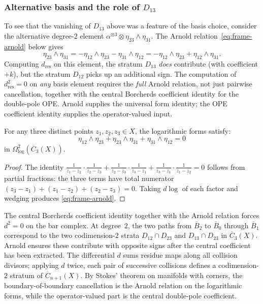 \subsubsection*{Alternative basis and the role of $D_{13}$}

To see that the vanishing of $D_{13}$ above was a feature
of the basis choice, consider the alternative degree-$2$ element
$\alpha^{\otimes 3} \otimes \eta_{23} \wedge \eta_{31}$.
The Arnold relation~\eqref{eq:frame-arnold} below gives
\[
\eta_{23} \wedge \eta_{31}
= -\eta_{12} \wedge \eta_{23} - \eta_{31} \wedge \eta_{12}
= -\eta_{12} \wedge \eta_{23} + \eta_{12} \wedge \eta_{31}.
\]
Computing $d_{\mathrm{res}}$ on this element, the stratum $D_{13}$
\emph{does} contribute (with coefficient $+k$), but the stratum
$D_{12}$ picks up an additional sign. The computation of
$d_{\mathrm{res}}^2 = 0$ on \emph{any} basis element
requires the \emph{full} Arnold relation, not just pairwise
cancellation, together with the central Borcherds coefficient identity
for the double-pole OPE. Arnold supplies the universal form identity;
the OPE coefficient identity supplies the operator-valued input.

\begin{proposition}\label{prop:frame-arnold}
For any three distinct points $z_1, z_2, z_3 \in X$, the
logarithmic forms satisfy:
\begin{equation}\label{eq:frame-arnold}
\eta_{12} \wedge \eta_{23} + \eta_{23} \wedge \eta_{31}
+ \eta_{31} \wedge \eta_{12} = 0
\end{equation}
in $\Omega^2_{\log}(\overline{C}_3(X))$.
\end{proposition}

\begin{proof}
The identity $\frac{1}{z_1-z_2}\cdot\frac{1}{z_2-z_3}
+ \frac{1}{z_2-z_3}\cdot\frac{1}{z_3-z_1}
+ \frac{1}{z_3-z_1}\cdot\frac{1}{z_1-z_2} = 0$
follows from partial fractions: the three terms have
total numerator $(z_3-z_1)+(z_1-z_2)+(z_2-z_3) = 0$.
Taking $d\log$ of each factor and wedging produces
\eqref{eq:frame-arnold}.
\end{proof}

The central Borcherds coefficient identity together with the Arnold
relation forces $d^2 = 0$ on the bar complex. At degree~$2$,
the two paths from $\bar{B}_2$ to $\bar{B}_0$ through $\bar{B}_1$
correspond to the two codimension-$2$ strata $D_{12} \cap D_{23}$ and
$D_{13} \cap D_{23}$ in $\overline{C}_3(X)$. Arnold ensures these
contribute with opposite signs after the central coefficient has been
extracted. The differential $d$ sums residue maps along all collision
divisors; applying $d$ twice, each pair of successive collisions defines
a codimension-$2$ stratum of $\overline{C}_{n+1}(X)$. By Stokes'
theorem on manifolds with corners, the boundary-of-boundary
cancellation is the Arnold relation on the logarithmic forms, while the
operator-valued part is the central double-pole coefficient.

